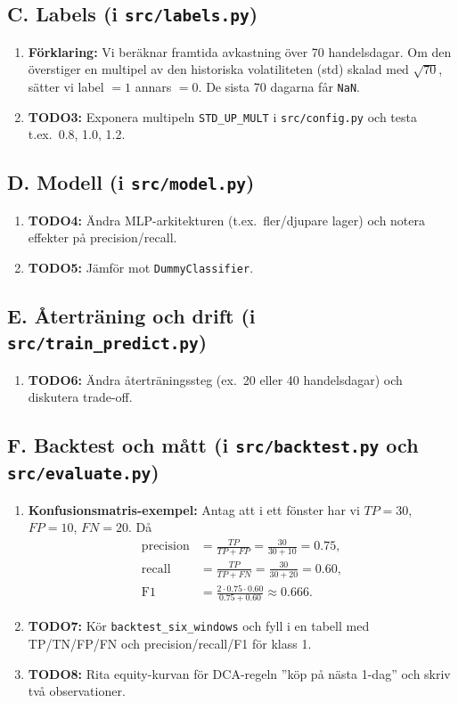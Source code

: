 \documentclass[11pt,a4paper]{scrartcl}
\begin{document}
\subsection*{C. Labels (i \texttt{src/labels.py})}
\begin{enumerate}
  \item \textbf{Förklaring:} Vi beräknar framtida avkastning över 70 handelsdagar. Om den överstiger en multipel av den historiska
  volatiliteten (std) skalad med $\sqrt{70}$, sätter vi label $= 1$ annars $= 0$. De sista 70 dagarna får \texttt{NaN}.
  \item \textbf{TODO3:} Exponera multipeln \texttt{STD\_UP\_MULT} i \texttt{src/config.py} och testa t.ex.\ 0.8, 1.0, 1.2.
\end{enumerate}

\subsection*{D. Modell (i \texttt{src/model.py})}
\begin{enumerate}
  \item \textbf{TODO4:} Ändra MLP-arkitekturen (t.ex.\ fler/djupare lager) och notera effekter på precision/recall.
  \item \textbf{TODO5:} Jämför mot \texttt{DummyClassifier}.
\end{enumerate}

\subsection*{E. Återträning och drift (i \texttt{src/train\_predict.py})}
\begin{enumerate}
  \item \textbf{TODO6:} Ändra återträningssteg (ex.\ 20 eller 40 handelsdagar) och diskutera trade-off.
\end{enumerate}

\subsection*{F. Backtest och mått (i \texttt{src/backtest.py} och \texttt{src/evaluate.py})}
\begin{enumerate}
  \item \textbf{Konfusionsmatris-exempel:} Antag att i ett fönster har vi $TP=30$, $FP=10$, $FN=20$. Då
  \begin{align*}
    \mathrm{precision} &= \frac{TP}{TP+FP} = \frac{30}{30+10} = 0.75,\\
    \mathrm{recall} &= \frac{TP}{TP+FN} = \frac{30}{30+20} = 0.60,\\
    \mathrm{F1} &= \frac{2\cdot 0.75 \cdot 0.60}{0.75 + 0.60} \approx 0.666.
  \end{align*}
  \item \textbf{TODO7:} Kör \texttt{backtest\_six\_windows} och fyll i en tabell med TP/TN/FP/FN och precision/recall/F1 för klass 1.
  \item \textbf{TODO8:} Rita equity-kurvan för DCA-regeln ”köp på nästa 1-dag” och skriv två observationer.
\end{enumerate}
\end{document}
